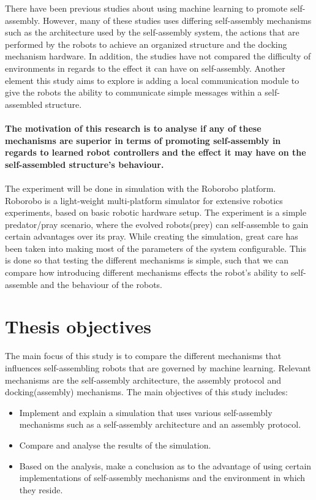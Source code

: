 There have been previous studies about using machine learning to promote self-assembly\cite{trianni_evolving_2004}\cite{montanier_adaptive_2014}\cite{li_co-evolution_2015}. 
However, many of these studies uses differing self-assembly mechanisms such as the architecture used by the self-assembly system, the actions that are performed by the robots to achieve an organized structure and the docking mechanism hardware.
In addition, the studies have not compared the difficulty of environments in regards to the effect it can have on self-assembly.
Another element this study aims to explore is adding a local communication module to give the robots the ability to communicate simple messages within a self-assembled structure.\\ \\
\textbf{The motivation of this research is to analyse if any of these mechanisms are superior in terms of promoting self-assembly in regards to learned robot controllers and the effect it may have on the self-assembled structure's behaviour.\\ \\}
The experiment will be done in simulation with the Roborobo platform. 
Roborobo is a light-weight multi-platform simulator for extensive robotics experiments, based on basic robotic hardware setup.
The experiment is a simple predator/pray scenario, where the evolved robots(prey) can self-assemble to gain certain advantages over its pray.
While creating the simulation, great care has been taken into making most of the parameters of the system configurable.
This is done so that testing the different mechanisms is simple, such that we can compare how introducing different mechanisms effects the robot's ability to self-assemble and the behaviour of the robots.

\section{Thesis objectives}
The main focus of this study is to compare the different mechanisms that influences self-assembling robots that are governed by machine learning. 
Relevant mechanisms are the self-assembly architecture, the assembly protocol and docking(assembly) mechanisms. 
The main objectives of this study includes:

\begin{itemize}

\item Implement and explain a simulation that uses various self-assembly mechanisms such as a self-assembly architecture and an assembly protocol.

\item Compare and analyse the results of the simulation. 

\item Based on the analysis, make a conclusion as to the advantage of using certain implementations of self-assembly mechanisms and the environment in which they reside.

\end{itemize}

